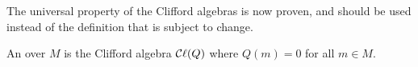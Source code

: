 \begin{remark}
  \label{mk:univ}

The universal property of the Clifford algebras is now proven, and should be used instead of the definition
that is subject to change.

\end{remark}

\begin{definition}
  \label{ExteriorAlgebra}
  \leanok

  An  over $M$ is the Clifford algebra $\mathop{\mathcal{C}\ell}(Q)$ where $Q(m) = 0$ for all $m \in M$.

\end{definition}